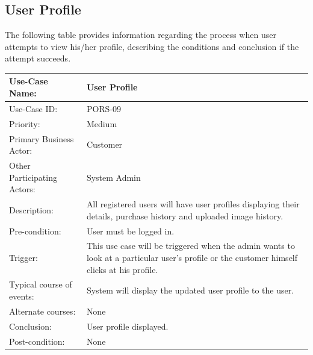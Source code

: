 \subsection{User Profile}
The following table provides information regarding the process when user attempts to view his/her profile, describing the conditions and conclusion if the attempt succeeds. 
\begin{center}
    \begin{tabular}{ @{}|p{5cm}||p{7cm}|  }
    \hline
    Use-Case Name: & User Profile \\ \hline
    Use-Case ID: & PORS-09 \\ \hline
    Priority: & Medium \\ \hline
    Primary Business Actor: & Customer \\ \hline
    Other Participating Actors: & System Admin \\ \hline
    Description: & All registered users will have user profiles displaying their details, purchase history and uploaded image history. \\ \hline
    Pre-condition: & User must be logged in. \\ \hline
    Trigger: & This use case will be triggered when the admin wants to look at a particular user’s profile or the customer himself clicks at his profile. \\ \hline
    Typical course of events: &  System will display the updated user profile to the user. \\ \hline
    Alternate courses: & None \\ \hline
    Conclusion: &  User profile displayed.\\ \hline
    Post-condition: &  None\\ \hline
    \end{tabular}
\end{center}

